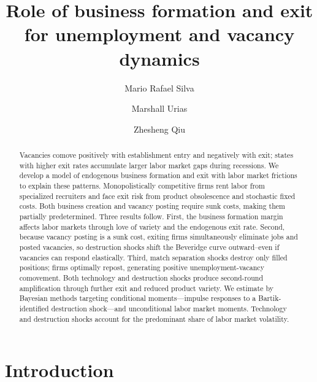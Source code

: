 \documentclass[authoryear, review, 12pt]{elsarticle}
\begin{document}
	\begin{frontmatter}
		\begin{abstract}
		Vacancies comove positively with establishment entry and negatively with exit; states with higher exit rates accumulate larger labor market gaps during recessions. We develop a model of endogenous business formation and exit with labor market frictions to explain these patterns. Monopolistically competitive firms rent labor from specialized recruiters and face exit risk from product obsolescence and stochastic fixed costs. Both business creation and vacancy posting require sunk costs, making them partially predetermined.
		Three results follow. First, the business formation margin affects labor markets through love of variety and the endogenous exit rate. Second, because vacancy posting is a sunk cost, exiting firms simultaneously eliminate jobs and posted vacancies, so destruction shocks shift the Beveridge curve outward--even if vacancies can respond elastically. Third, match separation shocks destroy only filled positions; firms optimally repost, generating positive unemployment-vacancy comovement. Both technology and destruction shocks produce second-round amplification through further exit and reduced product variety.
		We estimate by Bayesian methods targeting conditional moments—impulse responses to a Bartik-identified destruction shock—and unconditional labor market moments. Technology and destruction shocks account for the predominant share of labor market volatility.
		\end{abstract}
		
		\title{Role of business formation and exit for unemployment and vacancy dynamics}
		\author[affil1]{Mario Rafael Silva}
		\author[affil2]{Marshall Urias}
		\address[affil1]{Economics Department, Northeastern University}
		\address[affil2]{Peking University HSBC Business School}
		\author[affil3]{Zhesheng Qiu}
		\address[affil3]{Hong Kong University of Science and Technology}
		\fntext[]{}
	\end{frontmatter}
	\section{Introduction}\label{sec:introduction}
	
\end{document}
